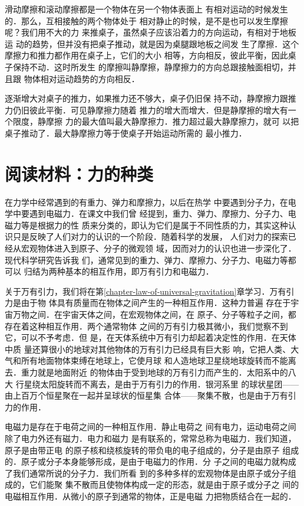     滑动摩擦和滚动摩擦都是一个物体在另一个物体表面上
有相对运动的时候发生的．那么，互相接触的两个物体处于
相对静止的时候，是不是也可以发生摩擦呢？我们用不大的力
来推桌子，虽然桌子应该沿着力的方向运动，有相对于地板运
动的趋势，但并没有把桌子推动，就是因为桌腿跟地板之间发
生了摩擦．这个摩擦力和推力都作用在桌子上，它们的大小
相等，方向相反，彼此平衡，因此桌子保持不动．这时所发生
的摩擦叫静摩擦，静摩擦力的方向总跟接触面相切，并且跟
物体相对运动趋势的方向相反．

    逐渐增大对桌子的推力，如果推力还不够大，桌子仍旧保
持不动，静摩擦力跟推力仍旧彼此平衡．可见静摩擦力随着
推力的增大而增大．但是静摩擦的增大有一个限度，静摩擦
力的最大值叫最大静摩擦力．推力超过最大静摩擦力，就可
以把桌子推动了．最大静摩擦力等于使桌子开始运动所需的
最小推力．


\section*{阅读材料：力的种类} 
    在力学中经常遇到的有重力、弹力和摩擦力，以后在热学
中要遇到分子力，在电学中要遇到电磁力．在课文中我们曾
经提到，重力、弹力、摩擦力、分子力、电磁力等是根据力的性
质来分类的，即认为它们是属于不同性质的力，其实这种认
识只是反映了人们对力的认识的一个阶段．随着科学的发展，
人们对力的探索已经从宏观物体进入到原子、分子的微观领
域，因而对力的认识也进一步深化了．现代科学研究告诉我
们，通常见到的重力、弹力、摩擦力、分子力、电磁力等都可以
归结为两种基本的相互作用，即万有引力和电磁力．

    关于万有引力，我们将在第\ref{chapter-law-of-universal-gravitation}章学习．万有引力是由于物
体具有质量而在物体之间产生的一种相互作用．这种力普遍
存在于宇宙万物之间．在宇宙天体之间，在宏观物体之间，在
原子、分子等粒子之间，都存在着这种相互作用．两个通常物体
之间的万有引力极其微小，我们觉察不到它，可以不予考虑．但
是，在天体系统中万有引力却起着决定性的作用．在天体中质
量还算很小的地球对其他物体的万有引力已经具有巨大影
响，它把人类、大气和所有地面物体束缚在地球上，它使月球
和人造地球卫星绕地球旋转而不能离去．重力就是地面附近
的物体由于受到地球的万有引力而产生的．太阳系中的八大
行星绕太阳旋转而不离去，是由于万有引力的作用．银河系里
的球状星团——由上百万个恒星聚在一起并呈球状的恒星集
合体——聚集不散，也是由于万有引力的作用．

    电磁力是存在于电荷之间的一种相互作用．静止电荷之
间有电力，运动电荷之间除了电力外还有磁力．电力和磁力
是有联系的，常常总称为电磁力．我们知道，原子是由带正电
的原子核和绕核旋转的带负电的电子组成的，分子是由原子
组成的．原子或分子本身能够形成，是由于电磁力的作用．分
子之间的电磁力就构成了我们通常所说的分子力．我们所看
到的多种多样的宏观物体是由原子或分子组成的，它们能聚
集不散而且使物体构成一定的形态，就是由于原子或分子之
间的电磁相互作用．从微小的原子到通常的物体，正是电磁
力把物质结合在一起的．

